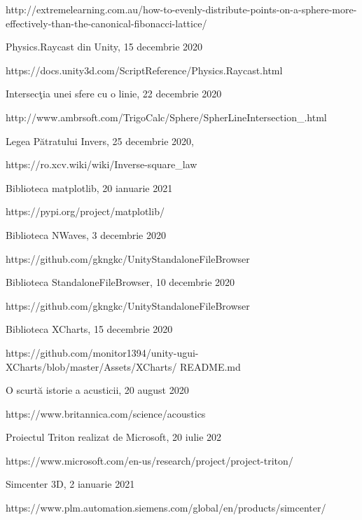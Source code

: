 \begin{thebibliography}{99.}
http://extremelearning.com.au/how-to-evenly-distribute-points-on-a-sphere-more-effectively-than-the-canonical-fibonacci-lattice/

 Physics.Raycast din Unity, 15 decembrie 2020

https://docs.unity3d.com/ScriptReference/Physics.Raycast.html 

 Intersec\c{t}ia unei sfere cu o linie, 22 decembrie 2020

http://www.ambrsoft.com/TrigoCalc/Sphere/SpherLineIntersection\_.html

 Legea Pătratului Invers, 25 decembrie 2020,

https://ro.xcv.wiki/wiki/Inverse-square\_law

 Biblioteca matplotlib, 20 ianuarie 2021

https://pypi.org/project/matplotlib/

 Biblioteca NWaves, 3 decembrie 2020

https://github.com/gkngkc/UnityStandaloneFileBrowser

 Biblioteca StandaloneFileBrowser, 10 decembrie 2020

https://github.com/gkngkc/UnityStandaloneFileBrowser

 Biblioteca XCharts, 15 decembrie 2020

https://github.com/monitor1394/unity-ugui-XCharts/blob/master/Assets/XCharts/ README.md

 O scurtă istorie a acusticii, 20 august 2020

https://www.britannica.com/science/acoustics

 Proiectul Triton realizat de Microsoft, 20 iulie 202

https://www.microsoft.com/en-us/research/project/project-triton/

 Simcenter 3D, 2 ianuarie 2021

https://www.plm.automation.siemens.com/global/en/products/simcenter/

\end{thebibliography}
